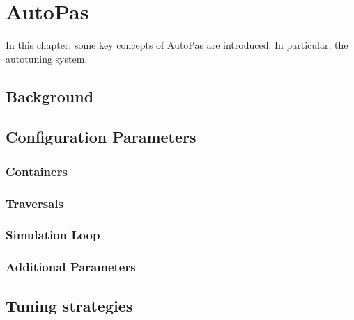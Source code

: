 \chapter[AutoPas]{AutoPas}
\label{cp:autopas}

{
\parindent0pt
In this chapter, some key concepts of AutoPas are introduced. In particular, the autotuning system.
}


\section{Background}

\section{Configuration Parameters}
\subsection{Containers}
\subsection{Traversals}
\subsection{Simulation Loop}
\subsection{Additional Parameters}

\section{Tuning strategies}
\label{sec:tuning_strategies}


